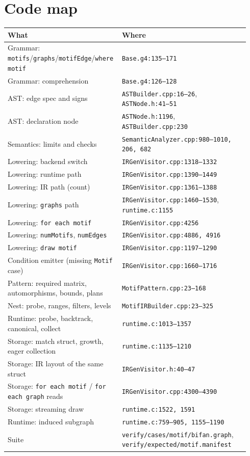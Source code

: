 \documentclass[11pt,a4paper]{article}
\newcommand{\code}[1]{\texttt{#1}}
\newcommand{\file}[1]{\texttt{#1}}
\begin{document}
\appendix

\section{Code map}

\begin{center}
\begin{tabular}{@{}p{0.42\linewidth}p{0.52\linewidth}@{}}
\toprule
What & Where \\
\midrule
Grammar: \code{motifs}/\code{graphs}/\code{motifEdge}/\code{where motif} & \file{Base.g4:135--171} \\
Grammar: comprehension & \file{Base.g4:126--128} \\
AST: edge spec and signs & \file{ASTBuilder.cpp:16--26}, \file{ASTNode.h:41--51} \\
AST: declaration node & \file{ASTNode.h:1196}, \file{ASTBuilder.cpp:230} \\
Semantics: limits and checks & \file{SemanticAnalyzer.cpp:980--1010, 206, 682} \\
Lowering: backend switch & \file{IRGenVisitor.cpp:1318--1332} \\
Lowering: runtime path & \file{IRGenVisitor.cpp:1390--1449} \\
Lowering: IR path (count) & \file{IRGenVisitor.cpp:1361--1388} \\
Lowering: \code{graphs} path & \file{IRGenVisitor.cpp:1460--1530}, \file{runtime.c:1155} \\
Lowering: \code{for each motif} & \file{IRGenVisitor.cpp:4256} \\
Lowering: \code{numMotifs}, \code{numEdges} & \file{IRGenVisitor.cpp:4886, 4916} \\
Lowering: \code{draw motif} & \file{IRGenVisitor.cpp:1197--1290} \\
Condition emitter (missing \code{Motif} case) & \file{IRGenVisitor.cpp:1660--1716} \\
Pattern: required matrix, automorphisms, bounds, plans & \file{MotifPattern.cpp:23--168} \\
Nest: probe, ranges, filters, levels & \file{MotifIRBuilder.cpp:23--325} \\
Runtime: probe, backtrack, canonical, collect & \file{runtime.c:1013--1357} \\
Storage: match struct, growth, eager collection & \file{runtime.c:1135--1210} \\
Storage: IR layout of the same struct & \file{IRGenVisitor.h:40--47} \\
Storage: \code{for each motif} / \code{for each graph} reads & \file{IRGenVisitor.cpp:4300--4390} \\
Storage: streaming draw & \file{runtime.c:1522, 1591} \\
Runtime: induced subgraph & \file{runtime.c:759--905, 1155--1190} \\
Suite & \file{verify/cases/motif/bifan.graph}, \file{verify/expected/motif.manifest} \\
\bottomrule
\end{tabular}
\end{center}
\end{document}
